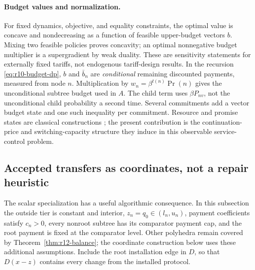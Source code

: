 \documentclass[11pt,letterpaper]{article}
\theoremstyle{definition}
\newcommand{\1}{\mathbf 1}
\begin{document}
\paragraph{Budget values and normalization.}
For fixed dynamics, objective, and equality constraints, the optimal value is concave and nondecreasing as a function of feasible upper-budget vectors $b$. Mixing two feasible policies proves concavity; an optimal nonnegative budget multiplier is a supergradient by weak duality. These are sensitivity statements for externally fixed tariffs, not endogenous tariff-design results. In the recursion \eqref{eq:r10-budget-dp}, $b$ and $\bar b_n$ are \emph{conditional} remaining discounted payments, measured from node $n$. Multiplication by $w_n=\beta^{t(n)}\Pr(n)$ gives the unconditional subtree budget used in $A$. The child term uses $\beta P_{nv}$, not the unconditional child probability a second time. Several commitments add a vector budget state and one such inequality per commitment. Resource and promise states are classical constructions \citep{Altman1999,SpearSrivastava1987,ThomasWorrall1988}; the present contribution is the continuation-price and switching-capacity structure they induce in this observable service-control problem.



\subsection{Accepted transfers as coordinates, not a repair heuristic}\label{sec:r13-flow}
The scalar specialization has a useful algorithmic consequence. In this subsection the outside tier is constant and interior, $z_n=q_0\in(l_n,u_n)$, payment coefficients satisfy $c_n>0$, every nonroot subtree has its comparator payment cap, and the root payment is fixed at the comparator level. Other polyhedra remain covered by Theorem~\ref{thm:r12-balance}; the coordinate construction below uses these additional assumptions. Include the root installation edge in $D$, so that $D(x-z)$ contains every change from the installed protocol.
\end{document}
